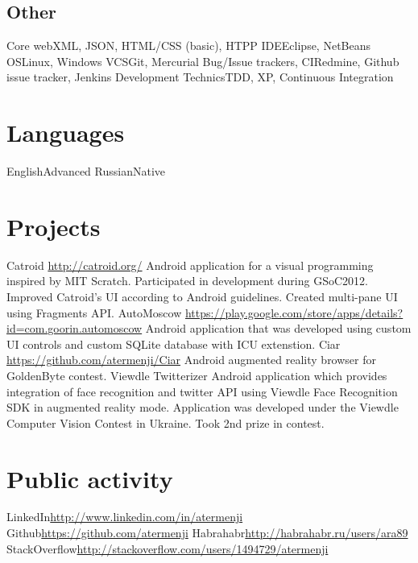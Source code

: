 \documentclass[11pt,a4paper]{moderncv}
\begin{document}
\subsection{Other}
\cvline
	{Core web}{XML, JSON, HTML/CSS (basic), HTPP}
\cvline
	{IDE}{Eclipse, NetBeans}
\cvline
	{OS}{Linux, Windows}
\cvline
	{VCS}{Git, Mercurial}
\cvline
	{Bug/Issue trackers, CI}{Redmine, Github issue tracker, Jenkins}
\cvline
	{Development Technics}{TDD, XP, Continuous Integration}

\section{Languages}
\cvitemwithcomment
	{English}{Advanced}{}
\cvitemwithcomment
	{Russian}{Native}{}

\section{Projects}
\cvline
    {Catroid}
    {\url{http://catroid.org/}\newline{}
    Android application for a visual programming inspired by MIT Scratch.
    Participated in development during GSoC2012. Improved Catroid's UI according to Android guidelines. 
    Created multi-pane UI using Fragments API.}
\cvline
    {AutoMoscow}
    {\url{https://play.google.com/store/apps/details?id=com.goorin.automoscow}\newline{}
    Android application that was developed using custom UI controls and custom SQLite database with ICU extenstion.}
\cvline
    {Ciar}
    {\url{https://github.com/atermenji/Ciar}\newline{}
    Android augmented reality browser for GoldenByte contest.}
\cvline
    {Viewdle Twitterizer}
    {Android application which provides integration of face recognition and twitter API
	using Viewdle Face Recognition SDK in augmented reality mode. Application was developed under 
	the Viewdle Computer Vision Contest in Ukraine. Took 2nd prize in contest.}

\section{Public activity}
\cvline
	{LinkedIn}{\url{http://www.linkedin.com/in/atermenji}}
\cvline
	{Github}{\url{https://github.com/atermenji}}
\cvline
	{Habrahabr}{\url{http://habrahabr.ru/users/ara89}}
\cvline
	{StackOverflow}{\url{http://stackoverflow.com/users/1494729/atermenji}}
\end{document}
